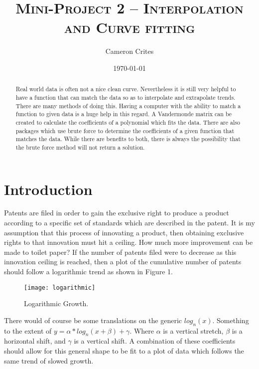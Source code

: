 \documentclass[12pt]{article}
\title{\textsc{Mini-Project 2 -- Interpolation and Curve fitting}}
\author{Cameron Crites}
\date{\today}
\begin{document}
\maketitle
\begin{abstract} 
Real world data is often not a nice clean curve. Nevertheless it is still very helpful to have a function that can match the data so as to interpolate and extrapolate trends. There are many methods of doing this. Having a computer with the ability to match a function to given data is a huge help in this regard. A Vandermonde matrix can be created to calculate the coefficients of a polynomial which fits the data. There are also packages which use brute force to determine the coefficients of a given function that matches the data. While there are benefits to both, there is always the possibility that the brute force method will not return a solution.
\end{abstract}
\pagebreak

\section{Introduction}\label{Sec_Introduction}
	\par \indent Patents are filed in order to gain the exclusive right to produce a product according to a specific set of standards which are described in the patent. It is my assumption that this process of innovating a product, then obtaining exclusive rights to that innovation must hit a ceiling. How much more improvement can be made to toilet paper? If the number of patents filed were to decrease as this innovation ceiling is reached, then a plot of the cumulative number of patents should follow a logarithmic trend as shown in Figure 1.\\
		\par
			\begin{wrapfigure}{r}{0.5\textwidth}
				\texttt{[image: logarithmic]}
				\caption{\label{fig1}Logarithmic Growth.}
			\end{wrapfigure}
		\indent There would of course be some translations on the generic $log_n(x)$. Something to the extent of $y=\alpha*log_n(x+\beta) + \gamma$. Where $\alpha$ is a vertical stretch, $\beta$ is a horizontal shift, and $\gamma$ is a vertical shift. A combination of these coefficients should allow for this general shape to be fit to a plot of data which follows the same trend of slowed growth.
\end{document}
